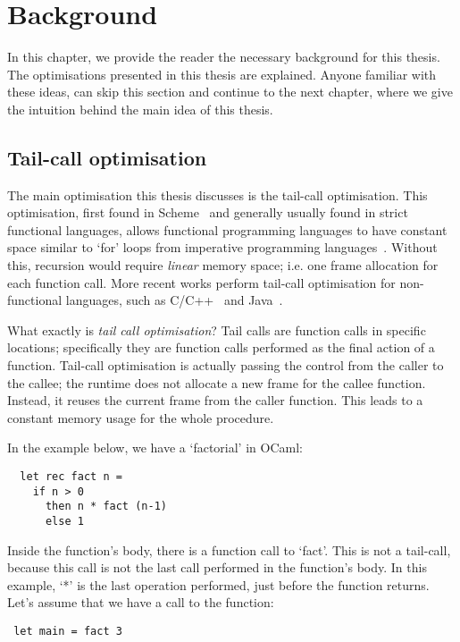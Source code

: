 \documentclass[diploma]{softlab-thesis}
\begin{document}
\chapter{Background}
\label{ch:background}

In this chapter, we provide the reader the necessary background for this thesis. The optimisations presented in this thesis 
are explained. Anyone familiar with these ideas, can skip this section and continue to the next chapter, where we give the intuition behind the
main idea of this thesis.

\section{Tail-call optimisation}
\label{sec:tco}

The main optimisation this thesis discusses is the tail-call optimisation. This optimisation, first found in Scheme~\cite{Sussman:1975:IEL:889230,Steele:1976:LUI:889232} and
generally usually found in strict functional languages, 
allows functional programming languages to have constant space 
similar to `for' loops from imperative programming languages~\cite{Clinger:1998:PTR:277650.277719}. 
Without this, recursion would require \textit{linear} memory space; 
i.e. one frame allocation for each function call. More recent works perform tail-call optimisation 
for non-functional languages, such as C/C++~\cite{Probst01} 
and Java~\cite{Madsen:2018:TCE:3178372.3179499}.

What exactly is \textit{tail call optimisation}? Tail calls are function calls in specific locations;
specifically they are function calls performed as the final action of a function. Tail-call optimisation is actually passing 
the control from the caller to the callee; the runtime does not allocate a new frame for the 
callee function. Instead, it reuses the current frame from the caller function. This leads to 
a constant memory usage for the whole procedure. 

In the example below, we have a `factorial' in OCaml:
\begin{verbatim}
  let rec fact n = 
    if n > 0 
      then n * fact (n-1)
      else 1
\end{verbatim}

Inside the function's body, there is a function call to `fact'. This is not a tail-call, because this call is not 
the last call performed in the function's body. In this example, `*' is the last operation performed, just before the function returns.
Let's assume that we have a call to the function:
\begin{verbatim}
 let main = fact 3
\end{verbatim}
\end{document}
